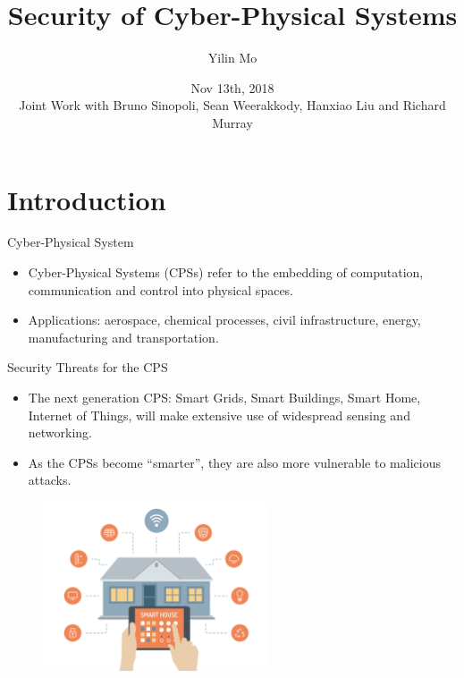 \documentclass[10pt]{beamer}
\title[Secure CPS]{Security of Cyber-Physical Systems}
\author[Yilin Mo]{Yilin Mo}
\institute[Tsinghua]{
  Department of Automation\\ Tsinghua University\\
}
\date[Nov 13, 2018]{ Nov 13th, 2018\\ 
  \small Joint Work with Bruno Sinopoli, Sean Weerakkody, Hanxiao Liu and Richard Murray}
\begin{document}
\maketitle 

\section{Introduction}

\begin{frame}{Cyber-Physical System}
  \begin{itemize}
  \item Cyber-Physical Systems (CPSs) refer to the embedding of computation, communication and control into physical spaces.
    \begin{center}
    \end{center}
  \item Applications: aerospace, chemical processes, civil infrastructure, energy, manufacturing and transportation. 
  \end{itemize}
\end{frame}

\begin{frame}{Security Threats for the CPS}
  \begin{itemize}
  \item The next generation CPS: Smart Grids, Smart Buildings, Smart Home, Internet of Things, will make extensive use of widespread sensing and networking.
  \item As the CPSs become ``smarter'', they are also more vulnerable to malicious attacks.
  \end{itemize}
  \begin{figure}[ht]
    \centering
    \includegraphics[width=0.6\textwidth]{SmartHome.jpg}
  \end{figure}
\end{frame}
\end{document}
